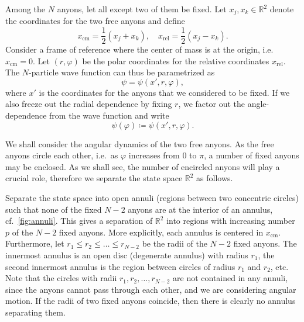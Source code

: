 Among the $N$ anyons, let all except two of them be fixed. Let $x_j, x_k \in \mathbb{R}^2$ denote the coordinates for the two free anyons and define
\begin{equation}
  x_\text{cm} = \frac{1}{2}(x_j + x_k), \quad
  x_\text{rel} = \frac{1}{2}(x_j - x_k).
\end{equation}
Consider a frame of reference where the center of mass is at the origin, i.e.\ $x_\text{cm} = 0$. Let $(r, \varphi)$ be the polar coordinates for the relative coordinates $x_\text{rel}$. The $N$-particle wave function can thus be parametrized as
\begin{equation}
  \psi = \psi(x', r, \varphi),
\end{equation}
where $x'$ is the coordinates for the anyons that we considered to be fixed. If we also freeze out the radial dependence by fixing $r$, we factor out the angle-dependence from the wave function and write
\begin{equation}
  \psi(\varphi) \coloneqq \psi(x', r, \varphi).
\end{equation}

We shall consider the angular dynamics of the two free anyons. As the free anyons circle each other, i.e.\ as $\varphi$ increases from $0$ to $π$, a number of fixed anyons may be enclosed. As we shall see, the number of encircled anyons will play a crucial role, therefore we separate the state space $\mathbb{R}^2$ as follows.

Separate the state space into open annuli (regions between two concentric circles) such that none of the fixed $N-2$ anyons are at the interior of an annulus, cf.\ \cref{fig:annuli}. This gives a separation of $\mathbb{R}^2$ into regions with increasing number $p$ of the $N-2$ fixed anyons. More explicitly, each annulus is centered in $x_\text{cm}$. Furthermore, let $r_1 \le r_2 \le \ldots \le r_{N-2}$ be the radii of the $N-2$ fixed anyons. The innermost annulus is an open disc (degenerate annulus) with radius $r_1$, the second innermost annulus is the region between circles of radius $r_1$ and $r_2$, etc. Note that the circles with radii $r_1, r_2, \ldots, r_{N-2}$ are not contained in any annuli, since the anyons cannot pass through each other, and we are considering angular motion. If the radii of two fixed anyons coincide, then there is clearly no annulus separating them.

